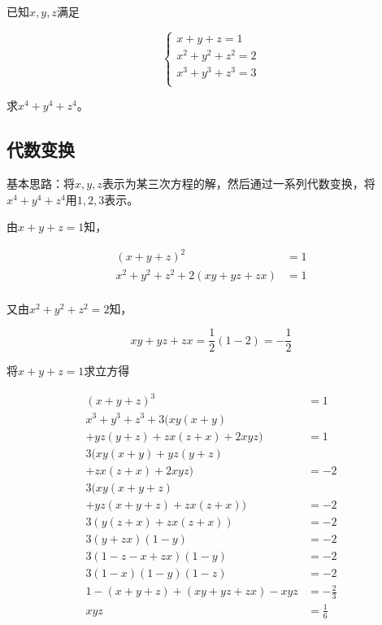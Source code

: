 

已知$x, y, z$满足

\[ \begin{cases}
  x + y + z = 1 \\
  x^2 + y^2 + z^2 = 2 \\
  x^3 + y^3 + z^3 = 3 \\
\end{cases} \]

求$x^4 + y^4 + z^4$。


\subsection{代数变换}

基本思路：将$x, y, z$表示为某三次方程的解，然后通过一系列代数变换，将$x^4 + y^4 + z^4$用$1, 2, 3$表示。

由$x + y + z = 1$知，

\begin{align*}
  (x + y + z)^2 &= 1 \\
  x^2 + y^2 + z^2 + 2(xy + yz + zx) &= 1 \\
\end{align*}

又由$x^2 + y^2 + z^2 = 2$知，

\[ xy + yz + zx = \frac12(1 - 2) = -\frac12 \]

将$x + y + z = 1$求立方得

\begin{align*}
  (x + y + z)^3 &= 1 \\
  x^3 + y^3 + z^3 + 3(xy(x + y) & \\
  + yz(y + z) + zx(z + x) + 2xyz) &= 1 \\
  3(xy(x + y) + yz(y + z) & \\
  + zx(z + x) + 2xyz) &= -2 \\
  3(xy(x + y + z) & \\
  + yz(x + y + z) + zx(z + x)) &= -2 \\
  3(y(z + x) + zx(z + x)) &= -2 \\
  3(y + zx)(1 - y) &= -2 \\
  3(1 - z - x + zx)(1 - y) &= -2 \\
  3(1 - x)(1 - y)(1 - z) &= -2 \\
  1 - (x + y + z) + (xy + yz + zx) - xyz &= -\frac23 \\
  xyz &= \frac16 \\
\end{align*}


